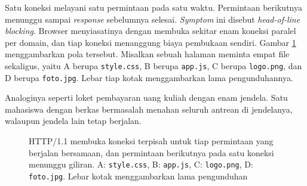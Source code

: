 Satu koneksi melayani satu permintaan pada satu waktu. Permintaan berikutnya
menunggu sampai \textit{response} sebelumnya selesai. \textit{Symptom} ini disebut
\textit{head-of-line blocking}. Browser menyiasatinya dengan membuka sekitar
enam koneksi paralel per domain, dan tiap koneksi menanggung biaya pembukaan
sendiri. Gambar \ref{fig:http1} menggambarkan pola tersebut. Misalkan sebuah
halaman meminta empat file sekaligus, yaitu A berupa \texttt{style.css}, B
berupa \texttt{app.js}, C berupa \texttt{logo.png}, dan D berupa
\texttt{foto.jpg}. Lebar tiap kotak menggambarkan lama pengunduhannya.

Analoginya seperti loket pembayaran uang kuliah dengan enam jendela. Satu
mahasiswa dengan berkas bermasalah menahan seluruh antrean di jendelanya,
walaupun jendela lain tetap berjalan.

\begin{figure}[!htb]
  \centering
  \caption{HTTP/1.1 membuka koneksi terpisah untuk tiap permintaan yang berjalan
           bersamaan, dan permintaan berikutnya pada satu koneksi menunggu
           giliran. A: \texttt{style.css}, B: \texttt{app.js},
           C: \texttt{logo.png}, D: \texttt{foto.jpg}. Lebar kotak
           menggambarkan lama pengunduhan}
  \label{fig:http1}
\end{figure}

